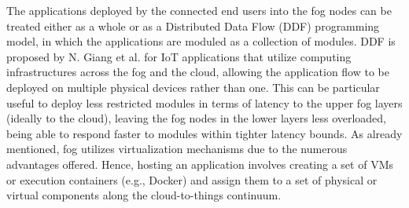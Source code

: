 The applications deployed by the connected end users into the fog nodes can be treated either as a whole or as a Distributed Data Flow (DDF) programming model, in which the applications are moduled as a collection of modules. DDF is proposed by N. Giang et al. \cite{giang2015developing} for IoT applications that utilize computing infrastructures across the fog and the cloud, allowing the application flow to be deployed on multiple physical devices rather than one. This can be particular useful to deploy less restricted modules in terms of latency to the upper fog layers (ideally to the cloud), leaving the fog nodes in the lower layers less overloaded, being able to respond faster to modules within tighter latency bounds. As already mentioned, fog utilizes virtualization mechanisms due to the numerous advantages offered. Hence, hosting an application involves creating a set of VMs or execution containers (e.g., Docker) and assign them to a set of physical or virtual components along the cloud-to-things continuum.

